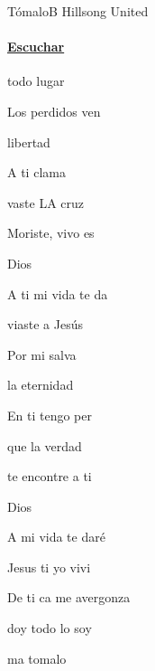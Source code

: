 \documentclass[12pt, spanish]{book}
\begin{document}
    \begin{song}{Tómalo}{B}
    {} %
    {Hillsong United}
    {} %
    {}
        \ifChordBk
            \paragraph{\mbox{}\hfill\protect\href{https://open.spotify.com/intl-es/track/7GjwGh4npXkgSAxrFZZRMI}{Escuchar}\mbox{}\hfill}
        \fi


        \begin{SBOpGroup}
             todo lugar

            Los perdidos ven

             libertad

            A ti clama

            vaste LA cruz

            Moriste, vivo es

             Dios

            A ti mi vida te da
        \end{SBOpGroup}

        \begin{SBOpGroup}
            viaste a Jesús

            Por mi salva

             la eternidad

            En ti tengo per

            que la verdad

             te encontre a ti

              Dios

            A  mi vida te daré
        \end{SBOpGroup}

        \begin{SBChorus}
            Jesus  ti yo vivi

            De ti ca me avergonza

             doy todo lo  soy

            ma tomalo


\end{SBChorus}
\end{song}
\end{document}
